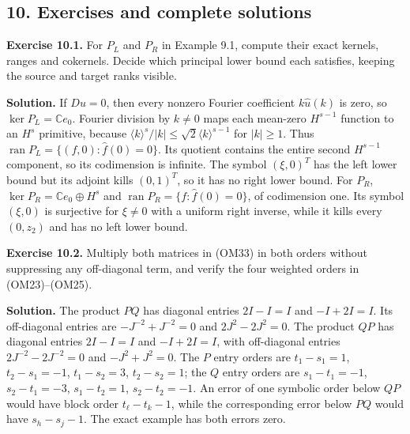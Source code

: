 \documentclass[
  11pt,
]{article}
\makeatletter
\let\ReaderOriginalAnchorStart\hyper@anchorstart
\let\ReaderOriginalAnchorEnd\hyper@anchorend
\let\ReaderPendingAliases\@empty
\def\ReaderArmAliases#1{\gdef\ReaderPendingAliases{#1}}
\def\hyper@anchorstart#1{\ReaderIfNativeAnchorTF{#1}{\ReaderPendingAliases\global\let\ReaderPendingAliases\@empty}{}\ReaderOriginalAnchorStart{#1}}
\makeatother
\begin{document}
\ReaderArmAliases{\ReaderOriginalAnchorStart{AN03-OMF-010}\ReaderOriginalAnchorEnd\begingroup\expandafter\def\csname @currentHref\endcsname{AN03-OMF-010}\label{AN03-OMF-010}\endgroup\ReaderOriginalAnchorStart{10-exercises-and-complete-solutions}\ReaderOriginalAnchorEnd\begingroup\expandafter\def\csname @currentHref\endcsname{10-exercises-and-complete-solutions}\label{10-exercises-and-complete-solutions}\endgroup}
\subsection{10. Exercises and complete
solutions}\label{exercises-and-complete-solutions}

\textbf{Exercise 10.1.} For \(P_L\) and \(P_R\) in Example 9.1, compute
their exact kernels, ranges and cokernels. Decide which principal lower
bound each satisfies, keeping the source and target ranks visible.

\textbf{Solution.} If \(Du=0\), then every nonzero Fourier coefficient
\(k\widehat u(k)\) is zero, so \(\ker P_L=\mathbb C e_0\). Fourier
division by \(k\ne0\) maps each mean-zero \(H^{s-1}\) function to an
\(H^s\) primitive, because
\(\langle k\rangle^s/|k|\le\sqrt2\langle k\rangle^{s-1}\) for
\(|k|\ge1\). Thus \(\operatorname{ran}P_L=\{(f,0):\widehat f(0)=0\}\).
Its quotient contains the entire second \(H^{s-1}\) component, so its
codimension is infinite. The symbol \((\xi,0)^T\) has the left lower
bound but its adjoint kills \((0,1)^T\), so it has no right lower bound.
For \(P_R\), \(\ker P_R=\mathbb C e_0\oplus H^s\) and
\(\operatorname{ran}P_R=\{f:\widehat f(0)=0\}\), of codimension one. Its
symbol \((\xi,0)\) is surjective for \(\xi\ne0\) with a uniform right
inverse, while it kills every \((0,z_2)\) and has no left lower bound.

\textbf{Exercise 10.2.} Multiply both matrices in (OM33) in both orders
without suppressing any off-diagonal term, and verify the four weighted
orders in (OM23)--(OM25).

\textbf{Solution.} The product \(PQ\) has diagonal entries \(2I-I=I\)
and \(-I+2I=I\). Its off-diagonal entries are \(-J^{-2}+J^{-2}=0\) and
\(2J^2-2J^2=0\). The product \(QP\) has diagonal entries \(2I-I=I\) and
\(-I+2I=I\), with off-diagonal entries \(2J^{-2}-2J^{-2}=0\) and
\(-J^2+J^2=0\). The \(P\) entry orders are \(t_1-s_1=1\),
\(t_2-s_1=-1\), \(t_1-s_2=3\), \(t_2-s_2=1\); the \(Q\) entry orders are
\(s_1-t_1=-1\), \(s_2-t_1=-3\), \(s_1-t_2=1\), \(s_2-t_2=-1\). An error
of one symbolic order below \(QP\) would have block order
\(t_\ell-t_k-1\), while the corresponding error below \(PQ\) would have
\(s_h-s_j-1\). The exact example has both errors zero.
\end{document}
